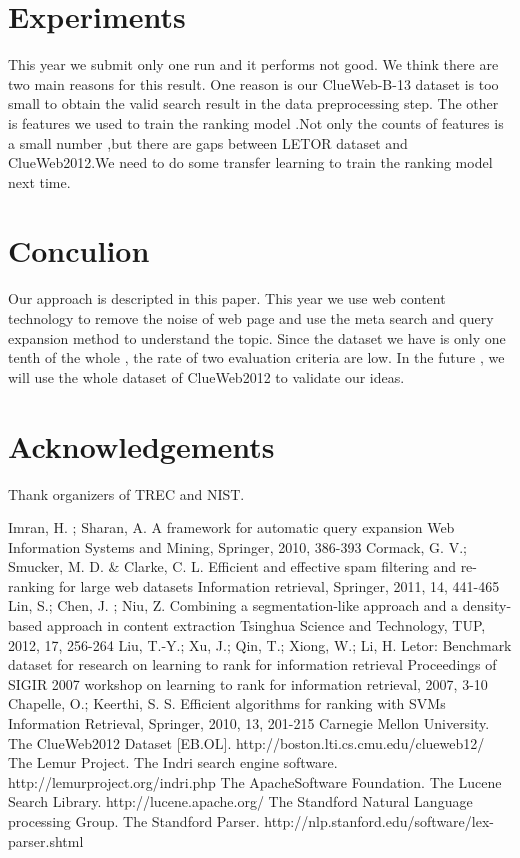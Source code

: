 \documentclass[runningheads,a4paper]{llncs}
\begin{document}
\section{Experiments}

This year we submit only one run and it performs not good. We think there are two main reasons for this result. One reason is our ClueWeb-B-13 dataset is too small to obtain the valid search result in the data preprocessing step. The other  is features we used to train the ranking model .Not only the counts of features is a small number ,but there are gaps between LETOR dataset and ClueWeb2012.We need to do some transfer learning  to train the ranking model next time.

\section{Conculion}

Our approach is descripted in this paper. This year we use web content technology to remove the noise of web page and use the meta search and query expansion method to understand the topic. Since the dataset we have is only one tenth of the whole ,  the rate of two evaluation criteria are low. In the future , we will use the whole dataset of ClueWeb2012 to validate our ideas.

\section{Acknowledgements}

Thank organizers of TREC and NIST.


\begin{thebibliography}{4}
Imran, H. ; Sharan, A. A framework for automatic query expansion Web Information Systems and Mining, Springer, 2010, 386-393
Cormack, G. V.; Smucker, M. D. \& Clarke, C. L. Efficient and effective spam filtering and re-ranking for large web datasets Information retrieval, Springer, 2011, 14, 441-465
Lin, S.; Chen, J. ; Niu, Z. Combining a segmentation-like approach and a density-based approach in content extraction Tsinghua Science and Technology, TUP, 2012, 17, 256-264
Liu, T.-Y.; Xu, J.; Qin, T.; Xiong, W.; Li, H. Letor: Benchmark dataset for research on learning to rank for information retrieval Proceedings of SIGIR 2007 workshop on learning to rank for information retrieval, 2007, 3-10
Chapelle, O.; Keerthi, S. S. Efficient algorithms for ranking with SVMs Information Retrieval, Springer, 2010, 13, 201-215
 Carnegie Mellon University. The ClueWeb2012 Dataset [EB.OL]. http://boston.lti.cs.cmu.edu/clueweb12/
 The Lemur Project. The Indri search engine software. http://lemurproject.org/indri.php
 The ApacheSoftware Foundation. The Lucene Search Library. http://lucene.apache.org/
 The Standford Natural Language processing Group. The Standford Parser. http://nlp.stanford.edu/software/lex-parser.shtml
\end{thebibliography}
\end{document}
